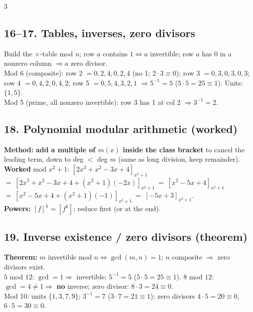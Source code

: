 \documentclass[9pt]{extarticle}
\newcommand{\hl}[1]{\textbf{\textcolor{BrickRed}{#1}}}
\begin{document}
\begin{multicols}{3}
\subsection{16--17. Tables, inverses, zero divisors}
\begin{sloppypar}\raggedright
Build the $\times$-table mod $n$; row $a$ contains $1\iff a$ invertible; row $a$ has $0$ in a nonzero column $\Rightarrow a$ zero divisor.\\
Mod 6 (composite): row 2 $=0,2,4,0,2,4$ (no 1; $2{\cdot}3\equiv0$); row 3 $=0,3,0,3,0,3$; row 4 $=0,4,2,0,4,2$; row 5 $=0,5,4,3,2,1$ $\Rightarrow5^{-1}{=}5$ ($5{\cdot}5{=}25\equiv1$). Units: $\{1,5\}$.\\
Mod 5 (prime, all nonzero invertible): row 3 has 1 at col 2 $\Rightarrow3^{-1}{=}2$.
\end{sloppypar}

\subsection{18. Polynomial modular arithmetic (worked)}
\begin{sloppypar}\raggedright
\textbf{Method:} \hl{add a multiple of $m(x)$ inside the class bracket} to cancel the leading term, down to deg $<$ deg $m$ (same as long division, keep remainder).\\
\textbf{Worked} mod $x^2{+}1$: $[2x^3{+}x^2{-}3x{+}4]_{x^2+1}$\\
$=\ [2x^3{+}x^2{-}3x{+}4+(x^2{+}1)(-2x)]_{x^2+1}\ =\ [x^2{-}5x{+}4]_{x^2+1}$\\
$=\ [x^2{-}5x{+}4+(x^2{+}1)(-1)]_{x^2+1}\ =\ [-5x{+}3]_{x^2+1}$.\\
\hl{Powers:} $[f]^k{=}[f^k]$; reduce first (or at the end).
\end{sloppypar}

\subsection{19. Inverse existence / zero divisors (theorem)}
\begin{sloppypar}\raggedright
\textbf{Theorem:} $m$ invertible mod $n\iff\gcd(m,n){=}1$; $n$ composite $\Rightarrow$ zero divisors exist.\\
$5$ mod $12$: $\gcd{=}1\Rightarrow$ invertible; $5^{-1}{=}5$ ($5{\cdot}5{=}25\equiv1$). $8$ mod $12$: $\gcd{=}4\ne1\Rightarrow$ \hl{no} inverse; zero divisor: $8{\cdot}3{=}24\equiv0$.\\
Mod 10: units $\{1,3,7,9\}$; $3^{-1}{=}7$ ($3{\cdot}7{=}21\equiv1$); zero divisors $4{\cdot}5{=}20\equiv0$, $6{\cdot}5{=}30\equiv0$.
\end{sloppypar}


\end{multicols}
\end{document}
